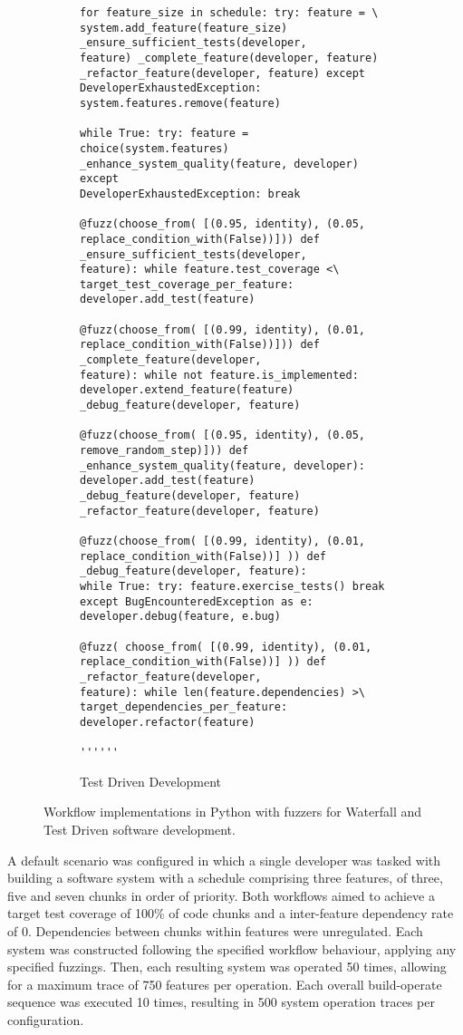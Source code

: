 \documentclass{sig-alternate}
\begin{document}
\begin{figure*}
\begin{subfigure}[b]{.45\linewidth}
\begin{lstlisting}[basicstyle=\ttfamily\scriptsize]
for feature_size in schedule: try: feature = \ system.add_feature(feature_size) _ensure_sufficient_tests(developer,
feature) _complete_feature(developer, feature) _refactor_feature(developer, feature) except DeveloperExhaustedException:
system.features.remove(feature)

while True: try: feature = choice(system.features) _enhance_system_quality(feature, developer) except
DeveloperExhaustedException: break

@fuzz(choose_from( [(0.95, identity), (0.05, replace_condition_with(False))])) def _ensure_sufficient_tests(developer,
feature): while feature.test_coverage <\ target_test_coverage_per_feature: developer.add_test(feature)

@fuzz(choose_from( [(0.99, identity), (0.01, replace_condition_with(False))])) def _complete_feature(developer,
feature): while not feature.is_implemented: developer.extend_feature(feature) _debug_feature(developer, feature)

@fuzz(choose_from( [(0.95, identity), (0.05, remove_random_step)])) def _enhance_system_quality(feature, developer):
developer.add_test(feature) _debug_feature(developer, feature) _refactor_feature(developer, feature)

@fuzz(choose_from( [(0.99, identity), (0.01, replace_condition_with(False))] )) def _debug_feature(developer, feature):
while True: try: feature.exercise_tests() break except BugEncounteredException as e: developer.debug(feature, e.bug)

@fuzz( choose_from( [(0.99, identity), (0.01, replace_condition_with(False))] )) def _refactor_feature(developer,
feature): while len(feature.dependencies) >\ target_dependencies_per_feature: developer.refactor(feature)

''''''
\end{lstlisting}

    \caption{Test Driven Development}
  \end{subfigure}

  \caption{Workflow implementations in Python with fuzzers for Waterfall and Test Driven software development.}
  \label{fig:workflow-impl}
\end{figure*}

A default scenario was configured in which a single developer was tasked with building a software system with a schedule
comprising three features, of three, five and seven chunks in order of priority.  Both workflows aimed to achieve a
target test coverage of 100\% of code chunks and a inter-feature dependency rate of 0.  Dependencies between chunks
within features were unregulated.  Each system was constructed following the specified workflow behaviour, applying any
specified fuzzings.  Then, each resulting system was operated 50 times, allowing for a maximum trace of 750 features per
operation. Each overall build-operate sequence was executed 10 times, resulting in 500 system operation traces per
configuration.
\end{document}
